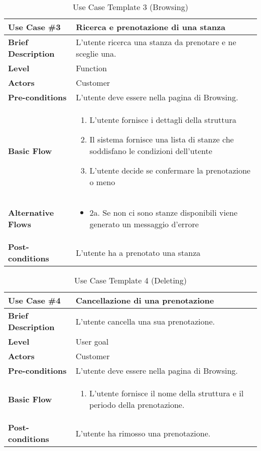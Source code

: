 \documentclass{article}
\begin{document}
\begin{table}[h!]
    \centering
    \begin{tabular}{|l|p{10cm}|}
        \hline
        \textbf{Use Case \#3} & Ricerca e prenotazione  di una stanza \\ \hline
        \textbf{Brief Description} & L’utente ricerca una stanza da prenotare e ne sceglie una.\\ \hline
        \textbf{Level} & Function \\ \hline
        \textbf{Actors} & Customer\\ \hline
        \textbf{Pre-conditions} & L’utente deve essere nella pagina di Browsing. \\ \hline
        \textbf{Basic Flow} & 
        \begin{enumerate}
            \item L’utente fornisce i dettagli della struttura
            \item Il sistema fornisce una lista di stanze che soddisfano le condizioni dell'utente
            \item L'utente decide se confermare la prenotazione o meno
        \end{enumerate} \\ \hline
        \textbf{Alternative Flows} & 
        \begin{itemize}
            \item 2a. Se non ci sono stanze disponibili viene generato un messaggio d'errore
        \end{itemize} \\ \hline
        \textbf{Post-conditions} &L'utente ha a prenotato una stanza\\ \hline
    \end{tabular}
    \caption{Use Case Template 3 (Browsing)}
    \label{tab:use_case_3}
\end{table}
\begin{table}[h!]
    \centering
    \begin{tabular}{|l|p{10cm}|}
        \hline
        \textbf{Use Case \#4} & Cancellazione di una prenotazione \\ \hline
        \textbf{Brief Description} & L’utente cancella una sua prenotazione.\\ \hline
        \textbf{Level} & User goal \\ \hline
        \textbf{Actors} & Customer\\ \hline
        \textbf{Pre-conditions} & L’utente deve essere nella pagina di Browsing. \\ \hline
        \textbf{Basic Flow} & 
        \begin{enumerate}
            \item L’utente fornisce il nome della struttura e il periodo della prenotazione.
        \end{enumerate} \\ \hline
        \textbf{Post-conditions} &L'utente ha rimosso una prenotazione.\\ \hline
    \end{tabular}
    \caption{Use Case Template 4 (Deleting)}
    \label{tab:use_case_4}
\end{table}
\end{document}
